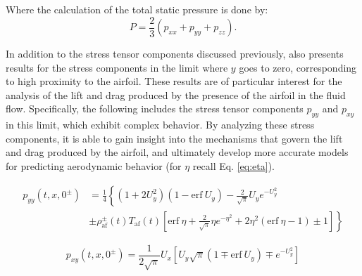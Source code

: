 

\restoregeometry
Where the calculation of the total static pressure is done by\cite{kogan1969rarefied}:
\begin{equation}
    P
    =
    \frac{2}{3}\left( p_{xx} + p_{yy} + p_{zz}\right)
    .
\end{equation}

In addition to the stress tensor components discussed previously, also presents results for the stress components in the limit where $y$ goes to zero, corresponding to high proximity to the airfoil. These results are of particular interest for the analysis of the lift and drag produced by the presence of the airfoil in the fluid flow. Specifically, the following includes the stress tensor components $p_{yy}$ and $p_{xy}$ in this limit, which exhibit complex behavior. By analyzing these stress components, it is able to gain insight into the mechanisms that govern the lift and drag produced by the airfoil, and ultimately develop more accurate models for predicting aerodynamic behavior (for $\eta$ recall Eq. \ref{eq:eta}).

\begin{equation}
\begin{aligned}
p_{yy}\left( t,x,0^{\pm }\right) & =\frac{1}{4}\left\{\left( 1 + 2U_{y}^{2}\right)( 1-\mathrm{erf} \ U_{y}) -\frac{2}{\sqrt{\pi }} U_{y} e^{- U_{y}^{2}}\right. \\
 & \left. \pm \rho _{\text{af}}^{\pm }( t) T_{\text{af}}( t)\left[\mathrm{erf} \ \eta +\frac{2}{\sqrt{\pi }} \eta e^{-\eta ^{2}} +2\eta ^{2}(\mathrm{erf} \ \eta -1) \pm 1\right]\right\}
\end{aligned}
\end{equation}

\begin{equation}
p_{xy}\left( t,x,0^{\pm }\right) =\frac{1}{2\sqrt{\pi }} U_{x}\left[ U_{y}\sqrt{\pi }( 1\mp \mathrm{erf} \ U_{y}) \mp e^{- U_{y}^{2}}\right]
\end{equation}

\newpage
